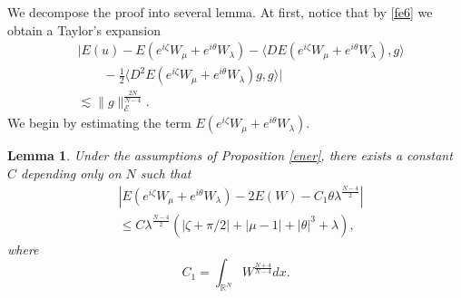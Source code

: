 \documentclass[a4paper,two-side,10pt]{amsart}
\newtheorem{lem}{Lemma}[section]
\newcommand{\R}{\mathbb{R}}
\numberwithin{equation}{section}
\begin{document}
We decompose the proof into several lemma. At first, notice that by \eqref{fe6} we obtain a Taylor's expansion 
\begin{align}
\label{enere1}
&\Big|E(u) - E (e^{i\zeta} W_\mu +e^{i\theta} W_\lambda) - \langle DE (e^{i\zeta} W_\mu +e^{i\theta} W_\lambda ),g \rangle\\
&\qquad - \tfrac{1}{2} \langle D^2 E (e^{i\zeta} W_\mu +e^{i\theta} W_\lambda) g,g \rangle \Big|\nonumber\\
& \lesssim \|g\|_{\mathcal{E}}^{\frac{2N}{N-4}}.\nonumber
\end{align}
We begin by estimating the term $ E (e^{i\zeta} W_\mu +e^{i\theta} W_\lambda)  $.
\begin{lem}
\label{lemener1}
Under the assumptions of Proposition \ref{ener}, there exists a constant $C$ depending only on $N$ such that
\begin{align*}
&\left|E(e^{i\zeta} W_\mu +e^{i\theta} W_\lambda) - 2E(W) - C_1\theta  \lambda^{\frac{N-4}{2}}   \right|\\
& \leq C \lambda^{\frac{N-4}{2}} (|\zeta +\pi /2| +|\mu -1| +|\theta|^3 +\lambda),
\end{align*}
where
\[
C_1=\int_{\R^N} W^{\frac{N+4}{N-4}} dx.
\]
\end{lem}
\end{document}
